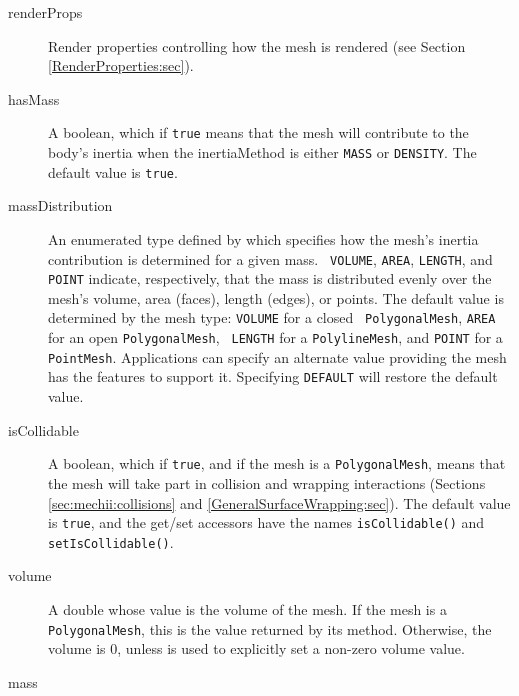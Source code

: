\begin{description}

\item[renderProps]\mbox{}

Render properties controlling how the mesh is
rendered (see Section \ref{RenderProperties:sec}).

\item[hasMass]\mbox{} 

A boolean, which if {\tt true} means that the mesh
will contribute to the body's inertia when the {\sf inertiaMethod}
is either {\tt MASS} or {\tt DENSITY}. The default value is {\tt true}.

\item[massDistribution]\mbox{} 

An enumerated type defined by
 which specifies how the
mesh's inertia contribution is determined for a given mass.  {\tt
VOLUME}, {\tt AREA}, {\tt LENGTH}, and {\tt POINT} indicate,
respectively, that the mass is distributed evenly over the mesh's
volume, area (faces), length (edges), or points. The default value is
determined by the mesh type: {\tt VOLUME} for a closed {\tt
PolygonalMesh}, {\tt AREA} for an open {\tt PolygonalMesh}, {\tt
LENGTH} for a {\tt PolylineMesh}, and {\tt POINT} for a {\tt
PointMesh}. Applications can specify an alternate value providing the
mesh has the features to support it. Specifying {\tt DEFAULT} will
restore the default value.

\item[isCollidable]\mbox{} 

A boolean, which if {\tt true}, and if the mesh is a
{\tt PolygonalMesh}, means that the mesh will take part in collision
and wrapping interactions (Sections \ref{sec:mechii:collisions} and
\ref{GeneralSurfaceWrapping:sec}). The default value is {\tt true},
and the get/set accessors have the names {\tt isCollidable()} and
{\tt setIsCollidable()}.

\item[volume]\mbox{} 

A double whose value is the volume of the mesh.  If the
mesh is a {\tt PolygonalMesh}, this is the value returned by its
 method.
Otherwise, the volume is 0, unless
 is
used to explicitly set a non-zero volume value.

\item[mass]\mbox{} 


\end{description}
